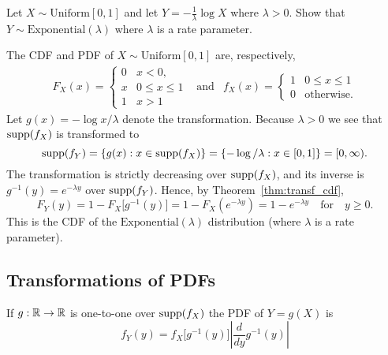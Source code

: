 \begin{example}
Let $X\sim\text{Uniform}[0,1]$ and let $Y = -\displaystyle\frac{1}{\lambda}\log X$ where $\lambda>0$. Show that $Y\sim\text{Exponential}(\lambda)$ where $\lambda$ is a rate parameter.
\begin{solution}
The CDF and PDF of $X\sim\text{Uniform}[0,1]$ are, respectively,
\[\begin{array}{lcl}
F_X(x) = \begin{cases}
	0	& x < 0, \\ 
	x	& 0\leq x\leq 1 \\
	1	& x > 1
\end{cases}
& \text{and} &
f_X(x) = \begin{cases}
	1	& 0\leq x\leq 1 \\
	0	& \text{otherwise.}
\end{cases}
\end{array}\]
Let $g(x) = -\log x/\lambda$ denote the transformation. Because $\lambda>0$ we see that $\text{supp}(f_X)$ is transformed to
\[
\text{supp}(f_Y) = \{g(x) : x\in\text{supp}(f_X)\} =\{-\log/\lambda : x\in[0,1]\} = [0,\infty).
\]
The transformation is strictly decreasing over $\text{supp}(f_X)$, and its inverse is $g^{-1}(y) = e^{-\lambda y}$ over $\text{supp}(f_Y)$. Hence, by Theorem~\ref{thm:transf_cdf},
\[
F_Y(y) 
	= 1 - F_X\big[g^{-1}(y)\big]
	= 1 - F_X(e^{-\lambda y})
	= 1 - e^{-\lambda y} \quad\text{for}\quad y\geq 0.
\]
This is the CDF of the $\text{Exponential}(\lambda)$ distribution (where $\lambda$ is a rate parameter).
\end{solution}
\end{example}

\subsection{Transformations of PDFs}

\begin{theorem}\label{thm:transf_pdfs}
If $g:\mathbb{R}\to\mathbb{R}$ is one-to-one over $\text{supp}(f_X)$ the PDF of $Y=g(X)$ is
\[
f_Y(y) = f_X\big[g^{-1}(y)\big]\left|\frac{d}{dy}g^{-1}(y)\right| %
\]
\end{theorem}

